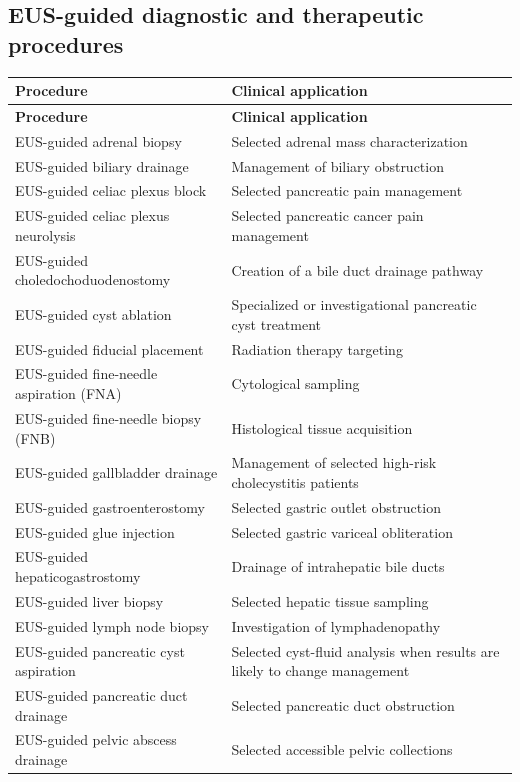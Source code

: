 \subsection{EUS-guided diagnostic and therapeutic procedures}
\begin{longtable}{@{}p{}p{}@{}}
\toprule
\textbf{Procedure} & \textbf{Clinical application} \\
\midrule
\endfirsthead
\toprule
\textbf{Procedure} & \textbf{Clinical application} \\
\midrule
\endhead
EUS-guided adrenal biopsy & Selected adrenal mass characterization \\
EUS-guided biliary drainage & Management of biliary obstruction \\
EUS-guided celiac plexus block & Selected pancreatic pain management \\
EUS-guided celiac plexus neurolysis & Selected pancreatic cancer pain management \\
EUS-guided choledochoduodenostomy & Creation of a bile duct drainage pathway \\
EUS-guided cyst ablation & Specialized or investigational pancreatic cyst treatment \\
EUS-guided fiducial placement & Radiation therapy targeting \\
EUS-guided fine-needle aspiration (FNA) & Cytological sampling \\
EUS-guided fine-needle biopsy (FNB) & Histological tissue acquisition \\
EUS-guided gallbladder drainage & Management of selected high-risk cholecystitis patients \\
EUS-guided gastroenterostomy & Selected gastric outlet obstruction \\
EUS-guided glue injection & Selected gastric variceal obliteration \\
EUS-guided hepaticogastrostomy & Drainage of intrahepatic bile ducts \\
EUS-guided liver biopsy & Selected hepatic tissue sampling \\
EUS-guided lymph node biopsy & Investigation of lymphadenopathy \\
EUS-guided pancreatic cyst aspiration & Selected cyst-fluid analysis when results are likely to change management \\
EUS-guided pancreatic duct drainage & Selected pancreatic duct obstruction \\
EUS-guided pelvic abscess drainage & Selected accessible pelvic collections \\

\end{longtable}
